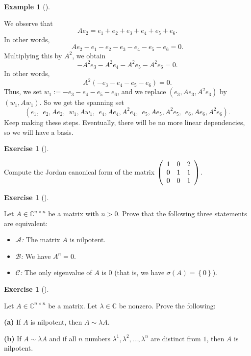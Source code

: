 \documentclass[numbers=enddot,12pt,final,onecolumn,notitlepage]{scrartcl}%
\newcounter{exer}
\numberwithin{exer}{subsection}
\theoremstyle{definition}
\newtheorem{exam}[theo]{Example}
\newenvironment{example}[1][]
{\begin{exam}[#1]\begin{leftbar}}
{\end{leftbar}\end{exam}}
\newtheorem{exmp}[exer]{Exercise}
\newenvironment{exercise}[1][]
{\begin{exmp}[#1]\begin{leftbar}}
{\end{leftbar}\end{exmp}}
\begin{document}
\begin{example}
We observe that%
\[
Ae_{2}=e_{1}+e_{2}+e_{3}+e_{4}+e_{5}+e_{6}.
\]
In other words,%
\[
Ae_{2}-e_{1}-e_{2}-e_{3}-e_{4}-e_{5}-e_{6}=0.
\]
Multiplying this by $A^{2}$, we obtain%
\[
-A^{2}e_{3}-A^{2}e_{4}-A^{2}e_{5}-A^{2}e_{6}=0.
\]
In other words,%
\[
A^{2}\left(  -e_{3}-e_{4}-e_{5}-e_{6}\right)  =0.
\]
Thus, we set $w_{1}:=-e_{3}-e_{4}-e_{5}-e_{6}$, and we replace $\left(
e_{3},Ae_{3},A^{2}e_{3}\right)  $ by $\left(  w_{1},Aw_{1}\right)  $. So we
get the spanning set
\[
\left(  e_{1},\ \ e_{2},Ae_{2},\ \ w_{1},Aw_{1},\ \ e_{4},Ae_{4},A^{2}%
e_{4},\ \ e_{5},Ae_{5},A^{2}e_{5},\ \ e_{6},Ae_{6},A^{2}e_{6}\right)  .
\]
Keep making these steps. Eventually, there will be no more linear
dependencies, so we will have a basis.
\end{example}

\begin{exercise}
 Compute the Jordan canonical form of the matrix $\left(
\begin{array}
[c]{ccc}%
1 & 0 & 2\\
0 & 1 & 1\\
0 & 0 & 1
\end{array}
\right)  $.
\end{exercise}

\begin{exercise}
\label{exe.jnf.step3.An=0} Let $A\in\mathbb{C}^{n\times n}$ be a
matrix with $n>0$. Prove that the following three statements are equivalent:

\begin{itemize}
\item $\mathcal{A}$\textit{:} The matrix $A$ is nilpotent.

\item $\mathcal{B}$\textit{:} We have $A^{n}=0$.

\item $\mathcal{C}$\textit{:} The only eigenvalue of $A$ is $0$ (that is, we
have $\sigma\left(  A\right)  =\left\{  0\right\}  $).
\end{itemize}
\end{exercise}

\begin{exercise}
 Let $A\in\mathbb{C}^{n\times n}$ be a matrix. Let $\lambda
\in\mathbb{C}$ be nonzero. Prove the following: \medskip

\textbf{(a)} If $A$ is nilpotent, then $A\sim\lambda A$. \medskip

\textbf{(b)} If $A\sim\lambda A$ and if all $n$ numbers $\lambda^{1}%
,\lambda^{2},\ldots,\lambda^{n}$ are distinct from $1$, then $A$ is nilpotent.
\end{exercise}
\end{document}
